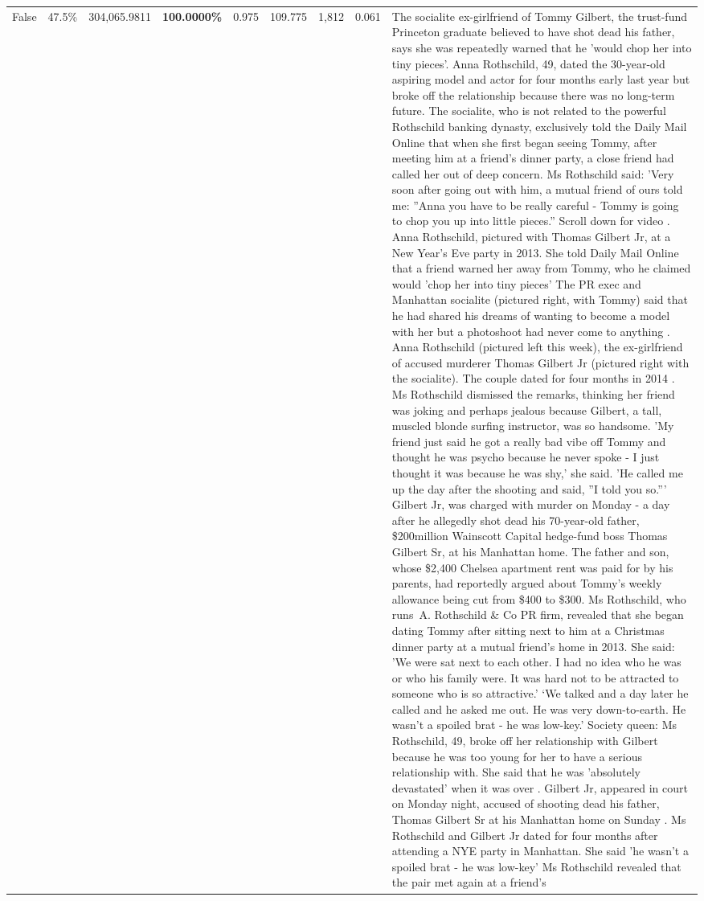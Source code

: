 \begin{table}[H]
\begin{tabular}{lllrlllll}
False & 47.5\% & \color{red} 304,065.9811 & \bfseries \color{red} 100.0000\% & 0.975 & 109.775 & 1,812 & 0.061 & The socialite ex-girlfriend of Tommy Gilbert, the trust-fund Princeton graduate believed to have shot dead his father, says she was repeatedly warned that he 'would chop her into tiny pieces'. Anna Rothschild, 49, dated the 30-year-old aspiring model and actor for four months early last year but broke off the relationship because there was no long-term future. The socialite, who is not related to the powerful Rothschild banking dynasty, exclusively told the Daily Mail Online that when she first began seeing Tommy, after meeting him at a friend's dinner party, a close friend had called her out of deep concern. Ms Rothschild said: 'Very soon after going out with him, a mutual friend of ours told me: ''Anna you have to be really careful - Tommy is going to chop you up into little pieces.'' Scroll down for video . Anna Rothschild, pictured with Thomas Gilbert Jr, at a New Year's Eve party in 2013. She told Daily Mail Online that a friend warned her away from Tommy, who he claimed would 'chop her into tiny pieces' The PR exec and Manhattan socialite (pictured right, with Tommy) said that he had shared his dreams of wanting to become a model with her but a photoshoot had never come to anything . Anna Rothschild (pictured left this week), the ex-girlfriend of accused murderer Thomas Gilbert Jr (pictured right with the socialite). The couple dated for four months in 2014 . Ms Rothschild dismissed the remarks, thinking her friend was joking and perhaps jealous because Gilbert, a tall, muscled blonde surfing instructor, was so handsome. 'My friend just said he got a really bad vibe off Tommy and thought he was psycho because he never spoke - I just thought it was because he was shy,' she said. 'He called me up the day after the shooting and said, ''I told you so.''' Gilbert Jr, was charged with murder on Monday - a day after he allegedly shot dead his 70-year-old father, \$200million Wainscott Capital hedge-fund boss Thomas Gilbert Sr, at his Manhattan home. The father and son, whose \$2,400 Chelsea apartment rent was paid for by his parents, had reportedly argued about Tommy's weekly allowance being cut from \$400 to \$300. Ms Rothschild, who runs A. Rothschild \& Co PR firm, revealed that she began dating Tommy after sitting next to him at a Christmas dinner party at a mutual friend's home in 2013. She said: 'We were sat next to each other. I had no idea who he was or who his family were. It was hard not to be attracted to someone who is so attractive.' ‘We talked and a day later he called and he asked me out. He was very down-to-earth. He wasn’t a spoiled brat - he was low-key.’ Society queen: Ms Rothschild, 49, broke off her relationship with Gilbert because he was too young for her to have a serious relationship with. She said that he was 'absolutely devastated' when it was over . Gilbert Jr, appeared in court on Monday night, accused of shooting dead his father, Thomas Gilbert Sr at his Manhattan home on Sunday . Ms Rothschild and Gilbert Jr dated for four months after attending a NYE party in Manhattan. She said 'he wasn't a spoiled brat - he was low-key' Ms Rothschild revealed that the pair met again at a friend’s 
\end{tabular}
\end{table}
